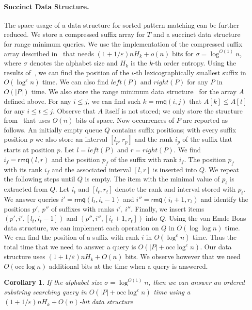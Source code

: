 \documentclass[11pt]{article}
\def\id#1{\ensuremath{\mathit{#1}}}
\let\idit=\id
\def\idrm#1{\ensuremath{\mathrm{#1}}}
\def\idsf#1{\ensuremath{\mathsf{#1}}}
\newtheorem{corollary}{Corollary}
\newcommand{\RMQ}{\idsf{rmq}}
\newcommand{\occ}{\idrm{occ}}
\newcommand{\lleft}{\idit{left}}
\newcommand{\rright}{\idit{right}}
\newcommand{\eps}{\varepsilon}
\begin{document}
\paragraph{Succinct Data Structure.}
The space usage of a data structure for sorted pattern matching can be 
further reduced.  We store a compressed suffix array for $T$ and a 
succinct data structure for range minimum queries. 
We use the implementation of the compressed suffix array described in~\cite{GrossiGV03} that needs $(1+1/\eps)nH_k+o(n)$ bits for $\sigma=\log^{O(1)}n$, where $\sigma$ denotes  the alphabet size  and $H_k$ is the $k$-th order entropy.
Using the results of~\cite{GrossiGV03}, we can find the position of the $i$-th lexicographically smallest  suffix in $O(\log^{\eps} n)$ time.  
We can also find $\lleft(P)$ and $\rright(P)$ for any $P$ in 
$O(|P|)$ time. 
We also store the range minimum data structure~\cite{Fis10} for the 
array $A$ defined above.  For any $i\le j$, we can find  such $k=\RMQ(i,j)$ that 
$A[k]\le A[t]$ for any $i\le t\le j$. Observe that $A$ itself is not stored; we only store the structure from~\cite{Fis10} that uses $O(n)$ bits of space. 
Now occurrences of $P$ are reported as follows. 
An initially empty queue $Q$ contains suffix positions;
with every suffix position $p$ we also store an interval $[l_p,r_p]$ and the rank $i_p$ of the suffix that starts at 
position $p$. Let $l=\lleft(P)$ and $r=\rright(P)$. We find 
$i_f=\RMQ(l,r)$ and  the position $p_f$ of the suffix with 
rank $i_f$. The position $p_f$ with its rank $i_f$ and the associated interval $[l,r]$ is inserted into $Q$. We repeat the following steps until $Q$ is empty.
The item with the minimal value of $p_t$ is extracted from 
$Q$. Let $i_t$ and $[l_t,r_t]$ denote the rank and interval stored with $p_t$. We answer queries $i'=\RMQ(l_t,i_t-1)$ and 
$i''=\RMQ(i_t+1,r_t)$ and identify the positions $p'$, $p''$ of suffixes with ranks $i'$, $i''$. Finally, we insert items 
$(p',i',[l_t,i_t-1])$ and $(p'',i'',[i_t+1,r_t])$ into 
$Q$. Using the van Emde Boas data structure, we can 
implement each operation on $Q$ in $O(\log \log n)$ time. 
We can find the position of a suffix with rank $i$ in 
$O(\log^{\eps} n)$ time. Thus the total time that 
we need to answer a query is $O(|P|+\occ\log^{\eps} n)$. 
Our data structure uses $(1+1/\eps)nH_k+O(n)$  bits. 
We observe however that we need $O(\occ\log n)$ additional 
bits at the time when a query is answered. 
\begin{corollary}\label{cor:sortcomp}
If the alphabet size $\sigma=\log^{O(1)}n$, then 
we can answer an ordered substring searching   query in $O(|P|+\occ\log^{\eps}n)$ time 
using a $(1+1/\eps)nH_k+O(n)$-bit data structure
\end{corollary}
\end{document}
